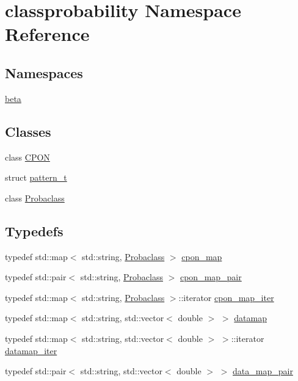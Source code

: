 \hypertarget{namespaceclassprobability}{}\section{classprobability Namespace Reference}
\label{namespaceclassprobability}
\subsection*{Namespaces}
\begin{DoxyCompactItemize}
\item 
 \hyperlink{namespaceclassprobability_1_1beta}{beta}
\end{DoxyCompactItemize}
\subsection*{Classes}
\begin{DoxyCompactItemize}
\item 
class \hyperlink{classclassprobability_1_1_c_p_o_n}{C\+P\+ON}
\item 
struct \hyperlink{structclassprobability_1_1pattern__t}{pattern\+\_\+t}
\item 
class \hyperlink{classclassprobability_1_1_probaclass}{Probaclass}
\end{DoxyCompactItemize}
\subsection*{Typedefs}
\begin{DoxyCompactItemize}
\item 
typedef std\+::map$<$ std\+::string, \hyperlink{classclassprobability_1_1_probaclass}{Probaclass} $>$ \hyperlink{namespaceclassprobability_a9b76324c0524b1c0c9d52954f83ad037}{cpon\+\_\+map}
\item 
typedef std\+::pair$<$ std\+::string, \hyperlink{classclassprobability_1_1_probaclass}{Probaclass} $>$ \hyperlink{namespaceclassprobability_af9fe3e67e0088680cf2535772e5f5139}{cpon\+\_\+map\+\_\+pair}
\item 
typedef std\+::map$<$ std\+::string, \hyperlink{classclassprobability_1_1_probaclass}{Probaclass} $>$\+::iterator \hyperlink{namespaceclassprobability_a1920ccfc2fa10ecbb9388bb967ff2efc}{cpon\+\_\+map\+\_\+iter}
\item 
typedef std\+::map$<$ std\+::string, std\+::vector$<$ double $>$ $>$ \hyperlink{namespaceclassprobability_a7c13c52cf87895179c1b746d4c8f4c77}{datamap}
\item 
typedef std\+::map$<$ std\+::string, std\+::vector$<$ double $>$ $>$\+::iterator \hyperlink{namespaceclassprobability_a0994aaee5966a00202024265c4adc3c5}{datamap\+\_\+iter}
\item 
typedef std\+::pair$<$ std\+::string, std\+::vector$<$ double $>$ $>$ \hyperlink{namespaceclassprobability_a88fdc064106d9d4c13e14223f57457e9}{data\+\_\+map\+\_\+pair}
\end{DoxyCompactItemize}


